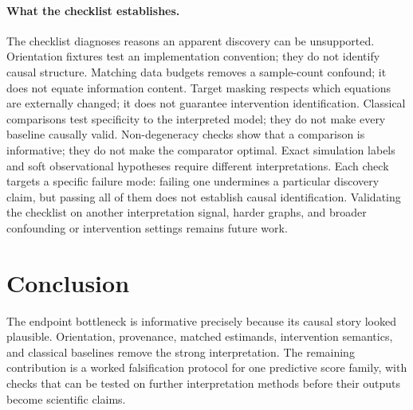\paragraph{What the checklist establishes.}
The checklist diagnoses reasons an apparent discovery can be unsupported.
Orientation fixtures test an implementation convention; they do not identify
causal structure. Matching data budgets removes a sample-count confound;
it does not equate information content. Target masking respects which
equations are externally changed; it does not guarantee intervention
identification. Classical comparisons test specificity to the interpreted
model; they do not make every baseline causally valid. Non-degeneracy checks
show that a comparison is informative; they do not make the comparator
optimal. Exact simulation
labels and soft observational hypotheses require different interpretations.
Each check targets a specific failure mode: failing one undermines a
particular discovery claim, but passing all of them does not establish
causal identification. Validating the checklist on
another interpretation signal, harder graphs, and broader confounding or
intervention settings remains future work.

\section{Conclusion}

The endpoint bottleneck is informative precisely because its causal story
looked plausible. Orientation, provenance, matched estimands, intervention
semantics, and classical baselines remove the strong interpretation. The
remaining contribution is a worked falsification protocol for one predictive
score family, with checks that can be tested on further interpretation
methods before their outputs become scientific claims.
